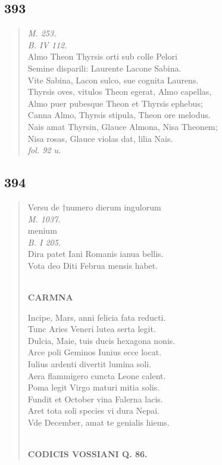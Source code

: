 \documentclass[11pt, a4paper]{report}
\begin{document}
            \subsection*{393}
      \begin{verse}
      \textit{M. 253.} \\ \textit{B. IV 112.} \\ Almo Theon Thyrsis orti sub colle Pelori \\ Semine disparili: Laurente Lacone Sabina. \\ Vite Sabina, Lacon sulco, sue cognita Laurens. \\ Thyrsis oves, vitulos Theon egerat, Almo capellas, \\ Almo puer pubesque Theon et Thyrsis ephebus; \\ Canna Almo, Thyrsis stipula, Theon ore melodus. \\ Nais amat Thyrsin, Glauce Almona, Nisa Theonem; \\ Nisa rosas, Glauce violas dat, lilia Nais. \\ \textit{fol. 92 u.} \\ 
      \end{verse}
  
            \subsection*{394}
      \begin{verse}
      Versu de †numero dierum ingulorum  \lbrack  \\ \textit{M. 1037.} \\ menium \\ \textit{B. I 205.} \\ Dira patet Iani Romanis ianua bellis. \\ Vota deo Diti Februa mensis habet. \\ 
        ﻿\pagebreak 
     \marginpar{[308]} \begin{center} \textbf{CARMNA} \end{center}Incipe, Mars, anni felicia fata reducti. \\ Tunc Aries Veneri lutea serta legit. \\ Dulcia, Maie, tuis ducis hexagona nonis. \\ Arce poli Geminos Iunius ecce locat. \\ Iulius ardenti divertit lumina soli. \\ Aera flammigero cuncta Leone calent. \\ Poma legit Virgo maturi mitia solis. \\ Fundit et October vina Falerna lacis. \\ Aret tota soli species vi dura Nepai. \\ Vde December, amat te genialis hiems. \\ 
        ﻿\pagebreak 
    \begin{center} \textbf{CODICIS VOSSIANI Q. 86.} \end{center}
      \end{verse}
  
\end{document}
